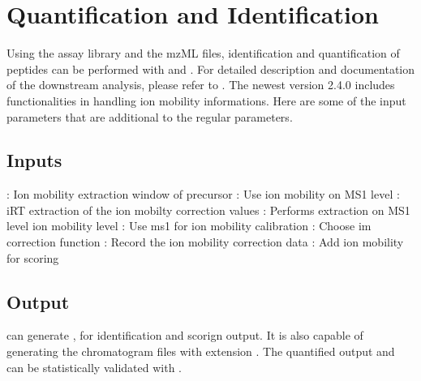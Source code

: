 \documentclass[letterpaper,10pt,english]{sphinxmanual}
\begin{document}
\chapter{Quantification and Identification}
\label{\detokenize{openswath:quantification-and-identification}}\label{\detokenize{openswath::doc}}
Using the assay library and the mzML files, identification and quantification of peptides
can be performed with  and . For detailed description
and documentation of the downstream analysis, please refer to . The newest  version 2.4.0
includes functionalities in handling ion mobility informations. Here are some of the
input parameters that are additional to the regular parameters.


\section{Inputs}
\label{\detokenize{openswath:inputs}}
\textendash{} : Ion mobility extraction window of precursor
\textendash{} : Use ion mobility on MS1 level
\textendash{} : iRT extraction of the ion mobilty correction values
\textendash{} : Performs extraction on MS1 level ion mobility level
\textendash{} : Use ms1 for ion mobility calibration
\textendash{} : Choose im correction function
\textendash{} : Record the ion mobility correction data
\textendash{} : Add ion mobility for scoring


\section{Output}
\label{\detokenize{openswath:output}}
 can generate ,  for identification and scorign output. It
is also capable of generating the chromatogram files with extension . The quantified
output  and  can be statistically validated with .
\end{document}
